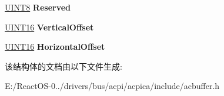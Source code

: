 \begin{DoxyCompactItemize}
\mbox{\label{structacpi__pld__info_aafe125b697d3f9776a8f0c21f2c9eb1a}} 
\hyperlink{_processor_bind_8h_ab27e9918b538ce9d8ca692479b375b6a}{U\+I\+N\+T8} {\bfseries Reserved}
\item 
\mbox{\label{structacpi__pld__info_ac6934f5db114ec37d16449cd040d3012}} 
\hyperlink{_processor_bind_8h_a09f1a1fb2293e33483cc8d44aefb1eb1}{U\+I\+N\+T16} {\bfseries Vertical\+Offset}
\item 
\mbox{\label{structacpi__pld__info_add6d91c448168d84bef0f935514ff891}} 
\hyperlink{_processor_bind_8h_a09f1a1fb2293e33483cc8d44aefb1eb1}{U\+I\+N\+T16} {\bfseries Horizontal\+Offset}
\end{DoxyCompactItemize}


该结构体的文档由以下文件生成\+:\begin{DoxyCompactItemize}
\item 
E\+:/\+React\+O\+S-\/0../drivers/bus/acpi/acpica/include/acbuffer.\+h\end{DoxyCompactItemize}
